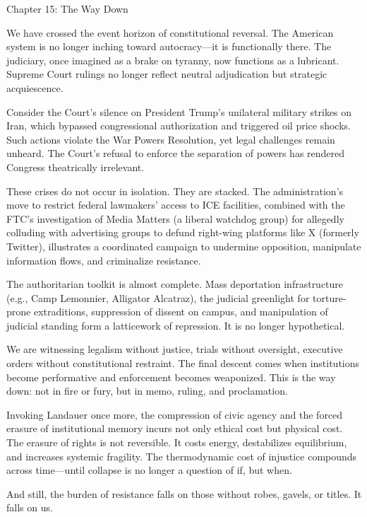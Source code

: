 \documentclass[
]{article}
\author{}
\date{}
\begin{document}
Chapter 15: The Way Down

We have crossed the event horizon of constitutional reversal. The American system is no longer inching toward autocracy---it is functionally there. The judiciary, once imagined as a brake on tyranny, now functions as a lubricant. Supreme Court rulings no longer reflect neutral adjudication but strategic acquiescence.

Consider the Court's silence on President Trump's unilateral military strikes on Iran, which bypassed congressional authorization and triggered oil price shocks. Such actions violate the War Powers Resolution, yet legal challenges remain unheard. The Court's refusal to enforce the separation of powers has rendered Congress theatrically irrelevant.

These crises do not occur in isolation. They are stacked. The administration's move to restrict federal lawmakers' access to ICE facilities, combined with the FTC's investigation of Media Matters (a liberal watchdog group) for allegedly colluding with advertising groups to defund right-wing platforms like X (formerly Twitter), illustrates a coordinated campaign to undermine opposition, manipulate information flows, and criminalize resistance.

The authoritarian toolkit is almost complete. Mass deportation infrastructure (e.g., Camp Lemonnier, Alligator Alcatraz), the judicial greenlight for torture-prone extraditions, suppression of dissent on campus, and manipulation of judicial standing form a latticework of repression. It is no longer hypothetical.

We are witnessing legalism without justice, trials without oversight, executive orders without constitutional restraint. The final descent comes when institutions become performative and enforcement becomes weaponized. This is the way down: not in fire or fury, but in memo, ruling, and proclamation.

Invoking Landauer once more, the compression of civic agency and the forced erasure of institutional memory incurs not only ethical cost but physical cost. The erasure of rights is not reversible. It costs energy, destabilizes equilibrium, and increases systemic fragility. The thermodynamic cost of injustice compounds across time---until collapse is no longer a question of if, but when.

And still, the burden of resistance falls on those without robes, gavels, or titles. It falls on us.
\end{document}
